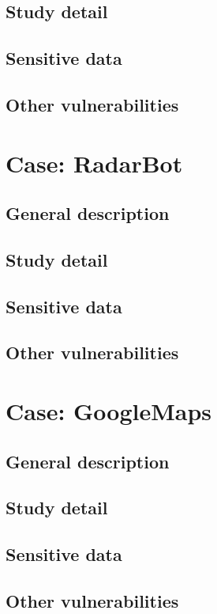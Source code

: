 		\subsection{Study detail}
		\subsection{Sensitive data}
		\subsection{Other vulnerabilities}

	\section{Case: RadarBot}
		\subsection{General description}
		\subsection{Study detail}
		\subsection{Sensitive data}
		\subsection{Other vulnerabilities}

	\section{Case: GoogleMaps}
	\label{sec:google_maps}
		\subsection{General description}
		\subsection{Study detail}
		\subsection{Sensitive data}
		\subsection{Other vulnerabilities}